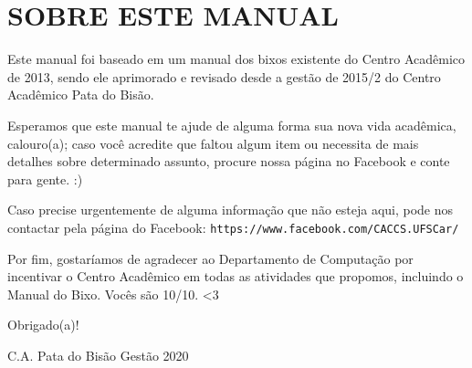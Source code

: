 \section{SOBRE ESTE MANUAL}
Este manual foi baseado em um manual dos bixos existente do Centro Acadêmico de 2013, sendo ele aprimorado e revisado desde a gestão de 2015/2 do Centro Acadêmico Pata do Bisão.

Esperamos que este manual te ajude de alguma forma sua nova vida acadêmica, calouro(a); caso você acredite que faltou algum item ou necessita de mais detalhes sobre determinado assunto, procure nossa página no Facebook e conte para gente. :)

Caso precise urgentemente de alguma informação que não esteja aqui, pode nos contactar pela página do Facebook: \texttt{https://www.facebook.com/CACCS.UFSCar/}

Por fim, gostaríamos de agradecer ao Departamento de Computação por incentivar o Centro Acadêmico em todas as atividades que propomos, incluindo o Manual do Bixo. Vocês são 10/10. <3

\begin{flushright}
  Obrigado(a)!

  C.A. Pata do Bisão Gestão 2020
\end{flushright}
